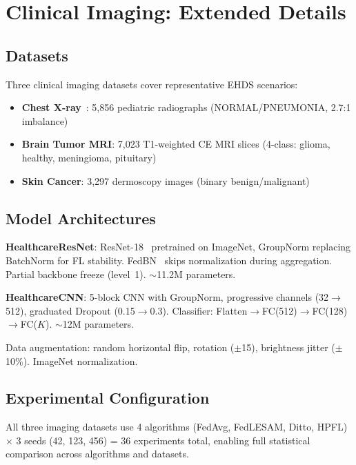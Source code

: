 \documentclass[conference,a4paper]{IEEEtran}
\begin{document}
\section{Clinical Imaging: Extended Details}
\label{sec:imaging}

\subsection{Datasets}

Three clinical imaging datasets cover representative EHDS scenarios:
\begin{itemize}
    \item \textbf{Chest X-ray}~\cite{chestxray2018}: 5,856 pediatric radiographs (NORMAL/PNEUMONIA, 2.7:1 imbalance)
    \item \textbf{Brain Tumor MRI}: 7,023 T1-weighted CE MRI slices (4-class: glioma, healthy, meningioma, pituitary)
    \item \textbf{Skin Cancer}: 3,297 dermoscopy images (binary benign/malignant)
\end{itemize}

\subsection{Model Architectures}

\textbf{HealthcareResNet}: ResNet-18~\cite{he2016deep} pretrained on ImageNet, GroupNorm replacing BatchNorm for FL stability. FedBN~\cite{li2021fedbn} skips normalization during aggregation. Partial backbone freeze (level~1). $\sim$11.2M parameters.

\textbf{HealthcareCNN}: 5-block CNN with GroupNorm, progressive channels (32$\to$512), graduated Dropout (0.15$\to$0.3). Classifier: Flatten$\to$FC(512)$\to$FC(128)$\to$FC($K$). $\sim$12M parameters.

Data augmentation: random horizontal flip, rotation ($\pm$15\textdegree), brightness jitter ($\pm$10\%). ImageNet normalization.

\subsection{Experimental Configuration}

All three imaging datasets use 4 algorithms (FedAvg, FedLESAM, Ditto, HPFL) $\times$ 3 seeds (42, 123, 456) = 36 experiments total, enabling full statistical comparison across algorithms and datasets.
\end{document}
